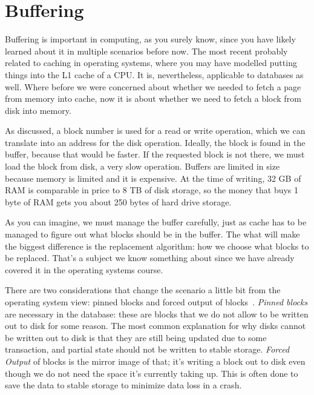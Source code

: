 




\section*{Buffering}

Buffering is important in computing, as you surely know, since you have likely learned about it in multiple scenarios before now. The most recent probably related to caching in operating systems, where you may have modelled putting things into the L1 cache of a CPU. It is, nevertheless, applicable to databases as well. Where before we were concerned about whether we needed to fetch a page from memory into cache, now it is about whether we need to fetch a block from disk into memory.

As discussed, a block number is used for a read or write operation, which we can translate into an address for the disk operation. Ideally, the block is found in the buffer, because that would be faster. If the requested block is not there, we must load the block from disk, a very slow operation. Buffers are limited in size because memory is limited and it is expensive. At the time of writing, 32 GB of RAM is comparable in price to 8 TB of disk storage, so the money that buys 1 byte of RAM gets you about 250 bytes of hard drive storage.

As you can imagine, we must manage the buffer carefully, just as cache has to be managed to figure out what blocks should be in the buffer. The what will make the biggest difference is the replacement algorithm: how we choose what blocks to be replaced. That's a subject we know something about since we have already covered it in the operating systems course.

There are two considerations that change the scenario a little bit from the operating system view: pinned blocks and forced output of blocks~\cite{dsc}. \textit{Pinned blocks} are necessary in the database: these are blocks that we do not allow to be written out to disk for some reason. The most common explanation for why disks cannot be written out to disk is that they are still being updated due to some transaction, and partial state should not be written to stable storage. \textit{Forced Output} of blocks is the mirror image of that; it's writing a block out to disk even though we do not need the space it's currently taking up. This is often done to save the data to stable storage to minimize data loss in a crash.

